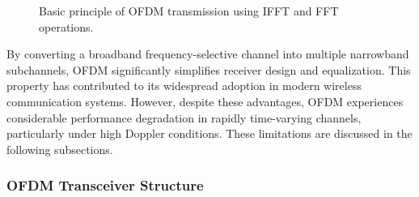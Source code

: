 \begin{figure}[H]
    \centering
    \caption{Basic principle of OFDM transmission using IFFT and FFT operations.}
    \label{fig:ofdm_basic_principle}
\end{figure}

By converting a broadband frequency-selective channel into multiple narrowband subchannels, OFDM significantly simplifies receiver design and equalization. This property has contributed to its widespread adoption in modern wireless communication systems. However, despite these advantages, OFDM experiences considerable performance degradation in rapidly time-varying channels, particularly under high Doppler conditions. These limitations are discussed in the following subsections.


\subsubsection{OFDM Transceiver Structure}

